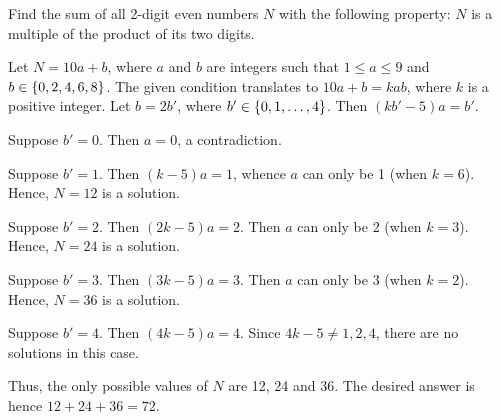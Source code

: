 \begin{question}[72]\label{Q::2024-J-1-15}
    Find the sum of all 2-digit even numbers $N$ with the following property: $N$ is a multiple of the product of its two digits.
\end{question}
\begin{solution*}
    Let $N = 10a + b$, where $a$ and $b$ are integers such that $1 \leq a \leq 9$ and $b \in \left\lbrace 0, 2, 4, 6, 8 \right\rbrace$. The given condition translates to $10a + b = kab$, where $k$ is a positive integer. Let $b = 2b'$, where $b' \in \left\lbrace 0, 1, \ldots, 4 \right\rbrace$. Then $(kb' - 5)a = b'$.

     Suppose $b' = 0$. Then $a = 0$, a contradiction.
    
     Suppose $b' = 1$. Then $(k-5)a = 1$, whence $a$ can only be 1 (when $k = 6$). Hence, $N = 12$ is a solution.
    
     Suppose $b' = 2$. Then $(2k-5)a = 2$. Then $a$ can only be 2 (when $k = 3$). Hence, $N = 24$ is a solution.

     Suppose $b' = 3$. Then $(3k - 5)a = 3$. Then $a$ can only be 3 (when $k = 2$). Hence, $N = 36$ is a solution.

     Suppose $b' = 4$. Then $(4k - 5)a = 4$. Since $4k - 5 \neq 1, 2, 4$, there are no solutions in this case.

    Thus, the only possible values of $N$ are 12, 24 and 36. The desired answer is hence $12 + 24 + 36 = 72$.
\end{solution*}


